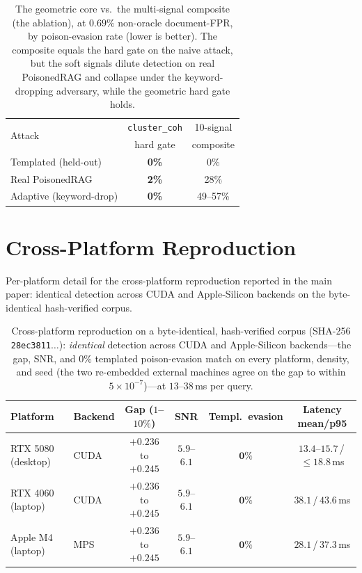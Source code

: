 \documentclass[10pt,journal,compsoc]{IEEEtran}
\begin{document}
\begin{table}[t]
\centering
\caption{The geometric core vs.\ the multi-signal composite (the ablation), at
$0.69\%$ non-oracle document-FPR, by poison-evasion rate (lower is better). The
composite equals the hard gate on the naive attack, but the soft signals dilute
detection on real PoisonedRAG and collapse under the keyword-dropping adversary,
while the geometric hard gate holds.}
\label{tab:core}
\begin{tabular}{lcc}
\toprule
\multirow{2}{*}{Attack} & \texttt{cluster\_coh} & 10-signal \\
       & hard gate & composite \\
\midrule
Templated (held-out)    & \textbf{0\%} & 0\% \\
Real PoisonedRAG        & \textbf{2\%} & 28\% \\
Adaptive (keyword-drop) & \textbf{0\%} & 49--57\% \\
\bottomrule
\end{tabular}
\end{table}

\section{Cross-Platform Reproduction}
\label{app:xplat}
Per-platform detail for the cross-platform reproduction reported in the main paper: identical detection across CUDA and Apple-Silicon backends on the byte-identical hash-verified corpus.

\begin{table}[t]
\centering
\caption{Cross-platform reproduction on a byte-identical, hash-verified corpus (SHA-256
\texttt{28ec3811}$\dots$): \emph{identical} detection across CUDA and Apple-Silicon
backends---the gap, SNR, and $0\%$ templated poison-evasion match on every platform,
density, and seed (the two re-embedded external machines agree on the gap to within
$5\times10^{-7}$)---at $13$--$38$\,ms per query.}
\label{tab:xplat}
\begin{tabular}{llcccc}
\toprule
Platform & Backend & Gap ($1$--$10\%$) & SNR & Templ.\ evasion & Latency mean/p95 \\
\midrule
RTX 5080 (desktop) & CUDA & $+0.236$ to $+0.245$ & $5.9$--$6.1$ & $\mathbf{0\%}$ & $13.4$--$15.7$\,/\,$\le\!18.8$\,ms \\
RTX 4060 (laptop) & CUDA & $+0.236$ to $+0.245$ & $5.9$--$6.1$ & $\mathbf{0\%}$ & $38.1$\,/\,$43.6$\,ms \\
Apple M4 (laptop) & MPS & $+0.236$ to $+0.245$ & $5.9$--$6.1$ & $\mathbf{0\%}$ & $28.1$\,/\,$37.3$\,ms \\
\bottomrule
\end{tabular}
\end{table}
\end{document}
